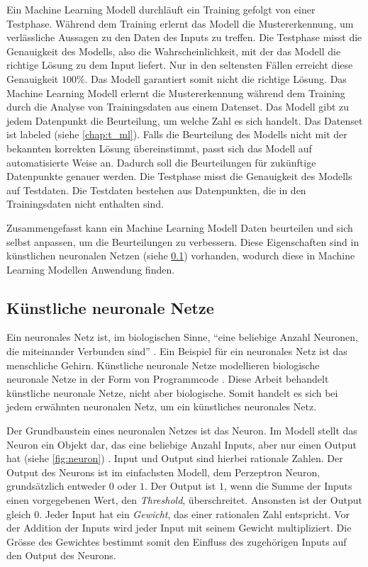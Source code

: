 Ein Machine Learning Modell durchläuft ein Training gefolgt von einer Testphase.
Während dem Training erlernt das Modell die Mustererkennung, um verlässliche
Aussagen zu den Daten des Inputs zu treffen. Die Testphase misst die Genauigkeit
des Modells, also die Wahrscheinlichkeit, mit der das Modell die richtige Lösung
zu dem Input liefert. Nur in den seltensten Fällen erreicht diese Genauigkeit
$100\%$. Das Modell garantiert somit nicht die richtige Lösung. Das Machine
Learning Modell erlernt die Mustererkennung während dem Training durch die
Analyse von Trainingsdaten aus einem Datenset. Das Modell gibt zu jedem
Datenpunkt die Beurteilung, um welche Zahl es sich handelt. Das Datenset ist
labeled (siehe \ref{chap:t_ml}). Falls die Beurteilung des Modells nicht mit der
bekannten korrekten Lösung übereinstimmt, passt sich das Modell auf
automatisierte Weise an. Dadurch soll die Beurteilungen für zukünftige
Datenpunkte genauer werden. Die Testphase misst die Genauigkeit des Modells auf
Testdaten. Die Testdaten bestehen aus Datenpunkten, die in den Trainingsdaten
nicht enthalten sind.
 
Zusammengefasst kann ein Machine Learning Modell Daten beurteilen und sich
selbst anpassen, um die Beurteilungen zu verbessern. Diese Eigenschaften sind in
künstlichen neuronalen Netzen (siehe \ref{sub:t_ml_nn}) vorhanden, wodurch
diese in Machine Learning Modellen Anwendung finden.
 
\subsection{Künstliche neuronale Netze}\label{sub:t_ml_nn} Ein neuronales Netz
ist, im biologischen Sinne, ``eine beliebige Anzahl Neuronen, die miteinander
Verbunden sind'' \cite{noauthor_neuronales_2021}. Ein Beispiel für ein neuronales
Netz ist das menschliche Gehirn. Künstliche neuronale Netze modellieren
biologische neuronale Netze in der Form von Programmcode
\cite{nagyfi_differences_2018}. Diese Arbeit behandelt künstliche neuronale
Netze, nicht aber biologische. Somit handelt es sich bei jedem erwähnten
neuronalen Netz, um ein künstliches neuronales Netz.
 
Der Grundbaustein eines neuronalen Netzes ist das Neuron. Im Modell stellt das
Neuron ein Objekt dar, das eine beliebige Anzahl Inputs, aber nur einen Output
hat (siehe \autoref{fig:neuron}) \cite{pramoditha_concept_2021}. Input und
Output sind hierbei rationale Zahlen. Der Output des Neurons ist im einfachsten
Modell, dem Perzeptron Neuron, grundsätzlich entweder $0$ oder $1$. Der Output ist
$1$, wenn die Summe der Inputs einen vorgegebenen Wert, den \emph{Threshold},
überschreitet. Ansonsten ist der Output gleich $0$. Jeder Input hat ein
\emph{Gewicht}, das einer rationalen Zahl entspricht. Vor der Addition der
Inputs wird jeder Input mit seinem Gewicht multipliziert. Die Grösse des
Gewichtes bestimmt somit den Einfluss des zugehörigen Inputs auf den Output des
Neurons. \cite{nielsen_neural_2015}

